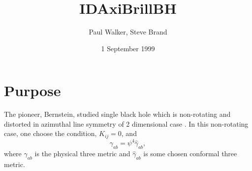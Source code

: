\documentclass{article}
\begin{document}
\title{IDAxiBrillBH}
\author{Paul Walker, Steve Brand}
\date{1 September 1999}
\maketitle


\section{Purpose}

The pioneer, Bernstein, studied single black hole which is
non-rotating and distorted in azimuthal line symmetry of 2 dimensional 
case \cite{Bernstein93a}. In this non-rotating case, one choose the
condition, $K_{ij} = 0$,  and 
\begin{equation}
\gamma_{ab} = \psi^4 \hat \gamma_{ab},
\end{equation}
where $\gamma_{ab}$ is the physical three metric and
$\hat{\gamma}_{ab}$ is some chosen conformal three metric.   
\end{document}
